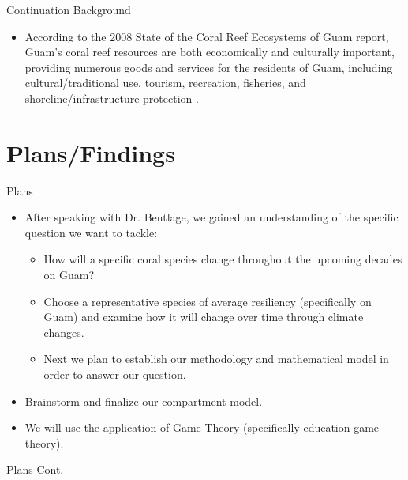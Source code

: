 \documentclass{beamer}
\begin{document}
\begin{frame}{Continuation Background}
    \begin{itemize}
        \item According to the 2008 State of the Coral Reef Ecosystems of Guam report, Guam’s coral reef resources are both economically and culturally important, providing numerous goods and services for the residents of Guam, including cultural/traditional use, tourism, recreation, fisheries, and shoreline/infrastructure protection \cite{guamwebsite}.
    \end{itemize}
\end{frame}

\section{Plans/Findings}
\begin{frame}{Plans}
    \begin{itemize}
        \item After speaking with Dr. Bentlage, we gained an understanding of the specific question we want to tackle:
        \begin{itemize}
            \item How will a specific coral species change throughout the upcoming decades on Guam? 
            \item Choose a representative species of average resiliency (specifically on Guam) and examine how it will change over time through climate changes.
            \item Next we plan to establish our methodology and mathematical model in order to answer our question.
        \end{itemize}
        \item Brainstorm and finalize our compartment model.
        \item We will use the application of Game Theory (specifically education game theory).
    \end{itemize}
\end{frame}
\begin{frame}{Plans Cont.}
\begin{center}
\end{center}
\end{frame}
\end{document}
